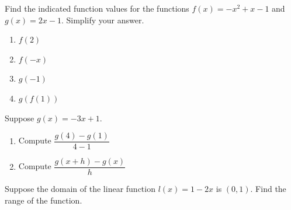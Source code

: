 \begin{exercise}

Find the indicated function values for the functions \(f(x)=-x^2+x-1\)
and \(g(x)=2x-1\). Simplify your answer.

\begin{enumerate}[twocol]
\item
  \(f(2)\)
\item
  \(f(-x)\)
\item
  \(g(-1)\)
\item
  \(g(f(1))\)
\end{enumerate}
\end{exercise}

\begin{exercise}

Suppose \(g(x) = -3x + 1\).

\begin{enumerate}
\item
  Compute \(\dfrac{g(4)-g(1)}{4-1}\)
\item
  Compute \(\dfrac{g(x+h)-g(x)}{h}\)
\end{enumerate}

\end{exercise}

\begin{exercise}
Suppose the domain of the linear function \(l(x)=1-2x\) is \((0, 1)\).
Find the range of the function.
\end{exercise}
\vspace*{5\baselineskip}

